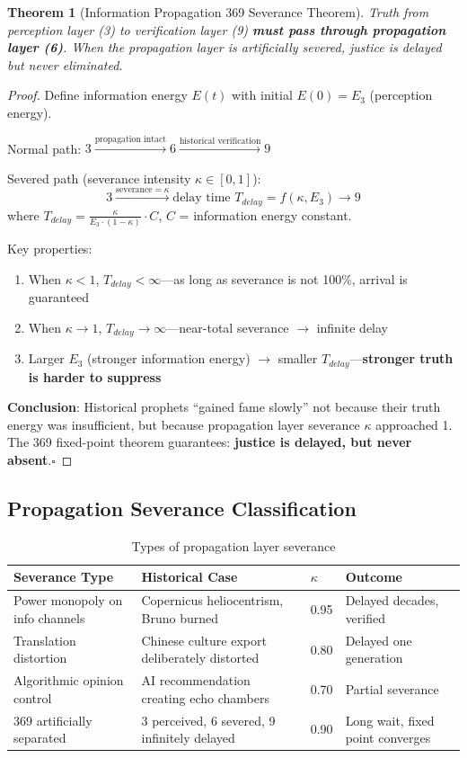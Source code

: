 \documentclass[conference]{IEEEtran}
\newtheorem{theorem}{Theorem}[section]
\theoremstyle{remark}
\begin{document}
\begin{theorem}[Information Propagation 369 Severance Theorem]
Truth from perception layer (3) to verification layer (9) \textbf{must pass through propagation layer (6)}. When the propagation layer is artificially severed, justice is delayed but never eliminated.
\end{theorem}
\begin{proof}
Define information energy $E(t)$ with initial $E(0)=E_3$ (perception energy).

Normal path: $3 \xrightarrow{\text{propagation intact}} 6 \xrightarrow{\text{historical verification}} 9$

Severed path (severance intensity $\kappa\in[0,1]$):
\[
3 \xrightarrow{\text{severance}=\kappa} \text{delay time } T_{delay} = f(\kappa, E_3) \xrightarrow{} 9
\]
where $T_{delay} = \frac{\kappa}{E_3\cdot(1-\kappa)}\cdot C$, $C$ = information energy constant.

Key properties:
\begin{enumerate}[nosep]
\item When $\kappa<1$, $T_{delay}<\infty$---as long as severance is not 100\%, arrival is guaranteed
\item When $\kappa\to 1$, $T_{delay}\to\infty$---near-total severance $\to$ infinite delay
\item Larger $E_3$ (stronger information energy) $\to$ smaller $T_{delay}$---\textbf{stronger truth is harder to suppress}
\end{enumerate}

\textbf{Conclusion}: Historical prophets ``gained fame slowly'' not because their truth energy was insufficient, but because propagation layer severance $\kappa$ approached 1. The 369 fixed-point theorem guarantees: \textbf{justice is delayed, but never absent}.\hfill$\square$
\end{proof}

\subsection{Propagation Severance Classification}

\begin{table}[h]
\centering
\caption{Types of propagation layer severance}
\label{tab:severance}
\begin{tabular}{p{2.5cm}p{2.5cm}p{1.2cm}p{2.2cm}}
\toprule
Severance Type & Historical Case & $\kappa$ & Outcome \\
\midrule
Power monopoly on info channels & Copernicus heliocentrism, Bruno burned & 0.95 & Delayed decades, verified \\
Translation distortion & Chinese culture export deliberately distorted & 0.80 & Delayed one generation \\
Algorithmic opinion control & AI recommendation creating echo chambers & 0.70 & Partial severance \\
369 artificially separated & 3 perceived, 6 severed, 9 infinitely delayed & 0.90 & Long wait, fixed point converges \\
\bottomrule
\end{tabular}
\end{table}
\end{document}
